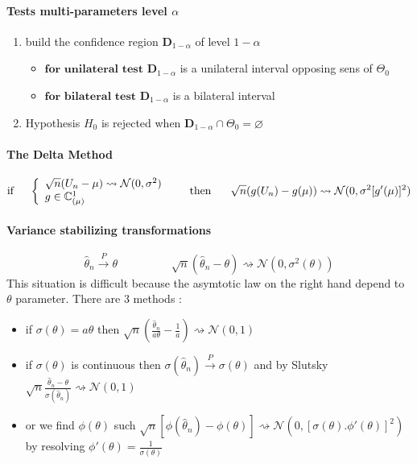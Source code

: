 \documentclass[a4paper,10pt]{article}
\begin{document}
\paragraph{Tests multi-parameters level $\alpha$} 
\begin{enumerate}
 \item build the confidence region $\textbf{D}_{1-\alpha}$ of level $1-\alpha$ 
 \begin{itemize}
 \item $\textbf{for unilateral test}$ $\textbf{D}_{1-\alpha}$ is a unilateral interval opposing sens of $\Theta_0$ 
 \item $\textbf{for bilateral test}$ $\textbf{D}_{1-\alpha}$ is a bilateral interval
 \end{itemize}
 \item Hypothesis $H_0$ is rejected when $\textbf{D}_{1-\alpha} \cap \Theta_0 = \varnothing$
\end{enumerate}

\paragraph{The Delta Method}
\[
\text{if} \hspace{5mm} 
\left\{ 
\begin{array}{l}
\sqrt{n}(U_n - \mu) \rightsquigarrow   \mathcal{N}(0,\sigma^{2}) \\
g \in \mathbb{C}^1_{(\mu)}
\end{array}\right. 
\hspace{5mm} \text{ then  } \hspace{5mm}
\sqrt{n}(g(U_n) - g(\mu) ) \rightsquigarrow   \mathcal{N}(0,\sigma^{2}[g'(\mu)]^2) 
\]
\paragraph{Variance stabilizing transformations}
\[
\widehat{\theta}_n \xrightarrow{P} \theta
\hspace{2cm}
\sqrt{n}(\widehat{\theta}_n - \theta) \rightsquigarrow   \mathcal{N}(0,\sigma^{2}(\theta))
\]
This situation is difficult because the asymtotic law on the right hand depend to $\theta$ parameter. There are 3 methods :
\begin{itemize}
 \item if $\sigma(\theta)=a\theta$ then $\sqrt{n}(\frac{\widehat{\theta}_n}{a\theta} - \frac{1}{a}) \rightsquigarrow   \mathcal{N}(0,1)$
 \item if $\sigma(\theta)$ is continuous then $\sigma(\widehat{\theta}_n) \xrightarrow{P} \sigma(\theta)$ and by Slutsky
$\sqrt{n}\frac{\widehat{\theta}_n - \theta}{\sigma(\widehat{\theta}_n)} \rightsquigarrow   \mathcal{N}(0,1)$
 \item or we find $\phi(\theta)$ such $\sqrt{n}[\phi(\widehat{\theta}_n) - \phi(\theta)] \rightsquigarrow   \mathcal{N}(0,[\sigma(\theta).\phi'(\theta)]^2)$
by resolving $\phi'(\theta) = \frac{1}{\sigma(\theta)}$
\end{itemize}
\end{document}
